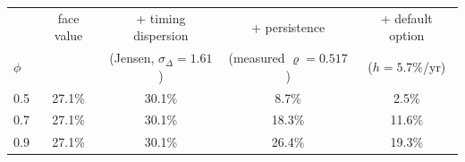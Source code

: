 \begin{tabular}{lcccc}
\toprule
 & face value & + timing dispersion & + persistence & + default option \\
$\phi$ & & (Jensen, $\sigma_\Delta = 1.61$) &
(measured $\varrho = 0.517$) & ($h = 5.7\%$/yr) \\
\midrule
0.5 & 27.1\% & 30.1\% & 8.7\% & 2.5\% \\
0.7 & 27.1\% & 30.1\% & 18.3\% & 11.6\% \\
0.9 & 27.1\% & 30.1\% & 26.4\% & 19.3\% \\
\bottomrule
\end{tabular}